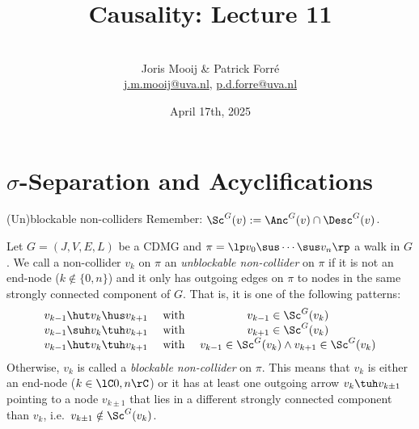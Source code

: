 \title[Causality]{Causality: Lecture 11}
\author[Joris Mooij]{\\[5mm]\large Joris Mooij \& Patrick Forr\'e\\
\url{j.m.mooij@uva.nl}, \url{p.d.forre@uva.nl}}
\date[2025-04-17]{\normalsize April 17th, 2025}
\maketitle

\part{$\sigma$-Separation and Acyclifications}
\frame{\partpage}

\begin{frame}{(Un)blockable non-colliders}
Remember: $\Sc^G(v) := \Anc^G(v) \cap \Desc^G(v)$.
\begin{Def}[\ref{def:unblockable_noncollider}]
  Let $G=(J,V,E,L)$ be a CDMG and $ \pi =\lp  v_0 \sus \cdots \sus v_n \rp $ a walk in $G$.
  We call a non-collider $v_k$ on $\pi$ an \emph{unblockable non-collider} on $\pi$ if it is not an end-node ($k \notin \{0,n\}$) and it only has outgoing edges on $\pi$ to nodes in the same strongly connected component of $G$. That is,
  it is one of the following patterns:
  \[\begin{array}{rccl}
    v_{k-1} \hut v_k \hus v_{k+1} & \text{ with } & v_{k-1} \in \Sc^G(v_{k})\\
    v_{k-1} \suh v_k \tuh v_{k+1} & \text{ with } & v_{k+1} \in \Sc^G(v_{k})\\
    v_{k-1} \hut v_k \tuh v_{k+1} & \text{ with } & v_{k-1} \in \Sc^G(v_k) \land v_{k+1} \in \Sc^G(v_k)
  \end{array}\]
  Otherwise, $v_k$ is called a \emph{blockable non-collider} on $\pi$.
  This means that $v_k$ is either an end-node ($k \in \lC 0,n\rC$) or it has at least one outgoing arrow 
  $v_k \tuh v_{k\pm1}$ pointing to a node $v_{k\pm1}$ that lies in a different strongly connected component than $v_k$, i.e.\ $v_{k\pm1} \notin \Sc^G(v_k)$.
\end{Def}
\end{frame}

